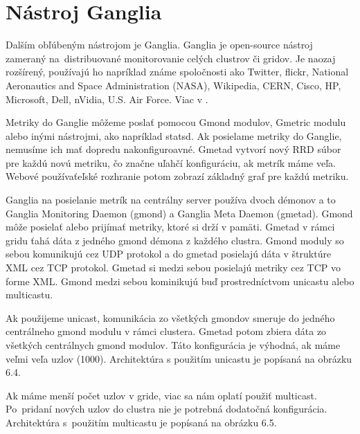 \documentclass[a4paper, upjsfrontpage, disablespecwarning, thesismargins, thesislinespacing]{rnthesis}
\begin{document}

\section{Nástroj Ganglia}

Dalším obľúbeným nástrojom je Ganglia.
Ganglia je open-source nástroj zameraný na~distribuované monitorovanie celých clustrov či gridov.
Je naozaj rozšírený, používajú ho napríklad známe spoločnosti ako Twitter, flickr, National Aeronautics and Space Administration (NASA), Wikipedia, CERN, Cisco, HP, Microsoft, Dell, nVidia, U.S. Air Force.
Viac v \cite{5}.

Metriky do Ganglie môžeme poslať pomocou Gmond modulov, Gmetric modulu alebo inými nástrojmi, ako napríklad statsd.
Ak posielame metriky do Ganglie, nemusíme ich mať dopredu nakonfiguroavné.
Gmetad vytvorí nový RRD súbor pre každú novú metriku, čo značne uľahčí konfiguráciu, ak metrík máme veľa.
Webové používaťeľské rozhranie potom zobrazí základný graf pre každú metriku.

Ganglia na posielanie metrík na centrálny server používa dvoch démonov a to Ganglia Monitoring Daemon (gmond) a Ganglia Meta Daemon (gmetad).
Gmond môže posielať alebo prijímať metriky, ktoré si drží v pamäti.
Gmetad v rámci gridu ťahá dáta z jedného gmond démona z každého clustra.
Gmond moduly so sebou komunikujú cez UDP protokol a do gmetad posielajú dáta v štruktúre XML cez TCP protokol.
Gmetad si medzi sebou posielajú metriky cez TCP vo forme XML.
Gmond medzi sebou kominikujú buď prostredníctvom unicastu alebo multicastu.

Ak použijeme unicast, komunikácia zo všetkých gmondov smeruje do jedného centrálneho gmond modulu v rámci clustera.
Gmetad potom zbiera dáta zo všetkých centrálnych gmond modulov.
Táto konfigurácia je výhodná, ak máme veľmi veľa uzlov (1000).
Architektúra s použitím unicastu je popísaná na obrázku 6.4.

Ak máme menší počet uzlov v gride, viac sa nám oplatí použiť multicast.
Po~pridaní nových uzlov do clustra nie je potrebná dodatočná konfigurácia.
Architektúra s~použitím multicastu je popísaná na obrázku 6.5.
\end{document}
